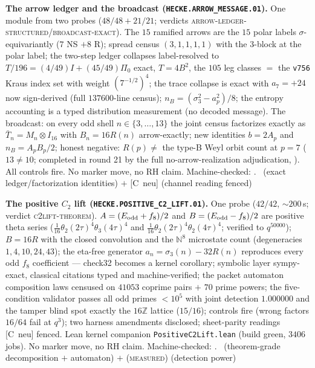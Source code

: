 \documentclass[11pt,a4paper]{article}
\newcommand{\Z}{\mathbb{Z}}
\theoremstyle{definition}
\begin{document}
\par\smallskip\noindent\textbf{The arrow ledger and the broadcast
(\texttt{HECKE.ARROW\_MESSAGE.01}).}
One module from two probes ($48/48+21/21$; verdicts
\textsc{arrow-ledger-structured}/\textsc{broadcast-exact}).  The
$15$ ramified arrows are the $15$ polar labels
$\sigma$-equivariantly ($7$ NS $+8$ R); spread census
$(3,1,1,1,1)$ with the 3-block at the polar label; the two-step
ledger collapses label-resolved to $T/196=(4/49)I+(45/49)\Pi_0$
exact, $T=4B^2$, the $105$ leg classes $=$ the \texttt{v756} Kraus
index set with weight $(7^{-1/2})^4$; the trace collapse is exact
with $a_7=+24$ now sign-derived (full $137600$-line census);
$n_B=(\sigma_3^2-a_p^2)/8$; the entropy accounting is a typed
distribution measurement (no decoded message).  The broadcast: on
every odd shell $n\in\{3,\dots,13\}$ the joint census factorizes
exactly as $\bar T_n=M_n\otimes I_{16}$ with $B_n=16R(n)$
arrow-exactly; new identities $b=2A_p$ and $n_B=A_pB_p/2$; honest
negative: $R(p)\neq$ the type-B Weyl orbit count at $p=7$
($13\neq10$; completed in round 21 by the full no-arrow-realization
adjudication, ).  All
controls fire.  No marker move, no RH claim.
Machine-checked: .
\mE\ (exact ledger/factorization identities) $+$ [C~neu] (channel
reading fenced)
\par\smallskip

\par\smallskip\noindent\textbf{The positive $C_2$ lift
(\texttt{HECKE.POSITIVE\_C2\_LIFT.01}).}
One probe ($42/42$, ${\sim}200$\,s; verdict
\textsc{c2lift-theorem}).  $A=(E_{\rm odd}+f_8)/2$ and
$B=(E_{\rm odd}-f_8)/2$ are positive theta series
($\tfrac1{16}\theta_2(2\tau)^4\theta_3(4\tau)^4$ and
$\tfrac1{16}\theta_2(2\tau)^4\theta_2(4\tau)^4$; verified to
$q^{50000}$); $B=16R$ with the closed convolution and the
$\mathbb N^8$ microstate count (degeneracies $1,4,10,24,43$); the
eta-free generator $a_n=\sigma_3(n)-32R(n)$ reproduces every odd
$f_8$ coefficient --- check32 becomes a kernel corollary; symbolic
layer sympy-exact, classical citations typed and machine-verified;
the packet automaton composition laws censused on $41053$ coprime
pairs $+$ $70$ prime powers; the five-condition validator passes
all odd primes $<10^5$ with joint detection $1.000000$ and the
tamper blind spot exactly the $16\Z$ lattice ($15/16$); controls
fire (wrong factors $16/64$ fail at $q^3$); two harness amendments
disclosed; sheet-parity readings [C~neu] fenced.  Lean kernel
companion \texttt{PositiveC2Lift.lean} (build green, $3406$ jobs).
No marker move, no RH claim.
Machine-checked: .
\mE\ (theorem-grade decomposition $+$ automaton) $+$
(\textsc{measured}) (detection power)
\par\smallskip
\end{document}
